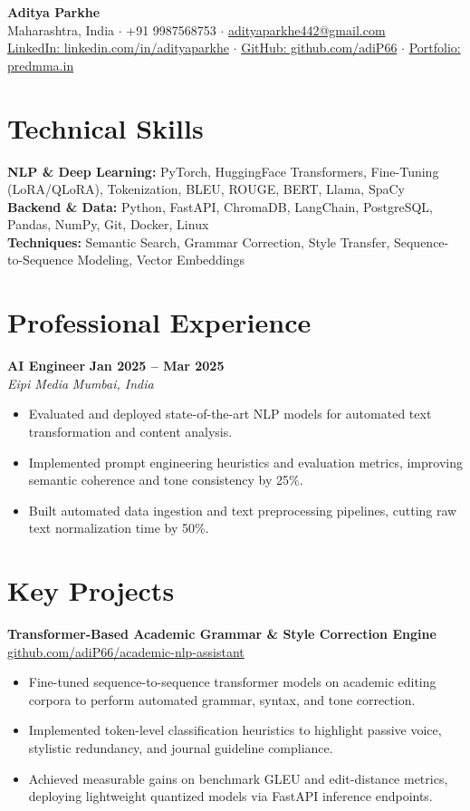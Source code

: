 \documentclass[10pt,a4paper]{article}
\begin{document}
\begin{center}
    {\LARGE \textbf{Aditya Parkhe}} \\[3pt]
    \small Maharashtra, India \; $\cdot$ \; +91 9987568753 \; $\cdot$ \; \href{mailto:adityaparkhe442@gmail.com}{adityaparkhe442@gmail.com} \\[2pt]
    \href{https://linkedin.com/in/adityaparkhe}{LinkedIn: linkedin.com/in/adityaparkhe} \; $\cdot$ \; \href{https://github.com/adiP66}{GitHub: github.com/adiP66} \; $\cdot$ \; \href{https://predmma.in}{Portfolio: predmma.in}
\end{center}

\section*{Technical Skills}
\textbf{NLP \& Deep Learning:} PyTorch, HuggingFace Transformers, Fine-Tuning (LoRA/QLoRA), Tokenization, BLEU, ROUGE, BERT, Llama, SpaCy \\
\textbf{Backend \& Data:} Python, FastAPI, ChromaDB, LangChain, PostgreSQL, Pandas, NumPy, Git, Docker, Linux \\
\textbf{Techniques:} Semantic Search, Grammar Correction, Style Transfer, Sequence-to-Sequence Modeling, Vector Embeddings

\section*{Professional Experience}
\textbf{AI Engineer} \hfill \textbf{Jan 2025 -- Mar 2025} \\
\textit{Eipi Media} \hfill \textit{Mumbai, India}
\begin{itemize}
    \item Evaluated and deployed state-of-the-art NLP models for automated text transformation and content analysis.
    \item Implemented prompt engineering heuristics and evaluation metrics, improving semantic coherence and tone consistency by 25\%.
    \item Built automated data ingestion and text preprocessing pipelines, cutting raw text normalization time by 50\%.
\end{itemize}

\section*{Key Projects}
\textbf{Transformer-Based Academic Grammar \& Style Correction Engine} \hfill \href{https://github.com/adiP66}{github.com/adiP66/academic-nlp-assistant}
\begin{itemize}
    \item Fine-tuned sequence-to-sequence transformer models on academic editing corpora to perform automated grammar, syntax, and tone correction.
    \item Implemented token-level classification heuristics to highlight passive voice, stylistic redundancy, and journal guideline compliance.
    \item Achieved measurable gains on benchmark GLEU and edit-distance metrics, deploying lightweight quantized models via FastAPI inference endpoints.
\end{itemize}
\end{document}
